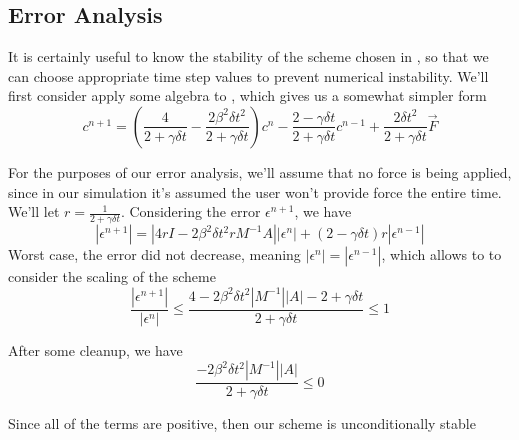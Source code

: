 \subsection{Error Analysis}
It is certainly useful to know the stability of the scheme chosen in \label{eq:finite_diff_solution}, so that we can
choose appropriate time step values to prevent numerical instability. We'll first consider apply some algebra to
\label{eq:finite_diff_solution}, which gives us a somewhat simpler form
\begin{equation}
c^{n+1} = \left(
    \frac{4}{2 + \gamma\delta t} - \frac{2\beta^2\delta t^2}{2 + \gamma\delta t}
\right) c^n
-
\frac{2 - \gamma\delta t}{2 + \gamma\delta t}c^{n-1}
+
\frac{2\delta t^2}{2 + \gamma\delta t}\vec{F}
\end{equation}

For the purposes of our error analysis, we'll assume that no force is being applied, since in our simulation it's
assumed the user won't provide force the entire time. We'll let $r = \frac{1}{2 + \gamma\delta t}$. Considering the
error $\epsilon^{n+1}$, we have
\begin{equation}
|\epsilon^{n+1}| = |4rI - 2\beta^2\delta t^2rM^{-1}A||\epsilon^n| + (2 - \gamma\delta t)r|\epsilon^{n-1}|
\end{equation}
Worst case, the error did not decrease, meaning $|\epsilon^{n}| = |\epsilon^{n-1}|$, which allows to to consider the
scaling of the scheme
\begin{equation}
\frac{|\epsilon^{n+1}|}{|\epsilon^{n}|}
\le
\frac{4 - 2\beta^2\delta t^2|M^{-1}||A| - 2 + \gamma\delta t}{2 + \gamma\delta t}
\le
1
\end{equation}

After some cleanup, we have
\begin{equation}
\frac{-2\beta^2\delta t^2|M^{-1}||A|}{2 + \gamma\delta t} \le 0
\end{equation}

Since all of the terms are positive, then our scheme is unconditionally stable

